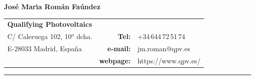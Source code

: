 \documentclass{article}
\begin{document}

{\huge \bf  Jos\'e Mar\'{\i}a Rom\'an Fa\'undez}

\bigskip \medskip

\begin{tabular}{lrl}
{\bf Qualifying Photovoltaics} & & {\medskip} \\
{\small C/ Caleruega 102, 10$^o$ dcha.}
   & {\small {\bf Tel:}} & {\small +34\,644\,72\,51\,74} \\
{\small E-28033 Madrid, Espa\~na}
   & {\small {\bf e-mail:}} & {\small jm.roman@qpv.es} \\
{\small}
   & {\small {\bf webpage:}} & {\small https://www.qpv.es/} \\

\end{tabular}

\bigskip

\hrule


\end{document}
